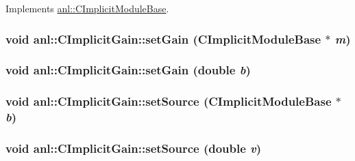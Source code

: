 Implements \hyperlink{classanl_1_1CImplicitModuleBase_ab88f8a1822dcfbc13ba5230318b0acd1}{anl::CImplicitModuleBase}.\hypertarget{classanl_1_1CImplicitGain_a39f85b449cb8e9ace24f8869772cb38f}{
\subsubsection[{setGain}]{\setlength{\rightskip}{0pt plus 5cm}void anl::CImplicitGain::setGain ({\bf CImplicitModuleBase} $\ast$ {\em m})}}
\label{classanl_1_1CImplicitGain_a39f85b449cb8e9ace24f8869772cb38f}
\hypertarget{classanl_1_1CImplicitGain_a045c26e10435c9a89907a2df59d92481}{
\subsubsection[{setGain}]{\setlength{\rightskip}{0pt plus 5cm}void anl::CImplicitGain::setGain (double {\em b})}}
\label{classanl_1_1CImplicitGain_a045c26e10435c9a89907a2df59d92481}
\hypertarget{classanl_1_1CImplicitGain_acbdbe734509bc6c3d69290e4187cf9af}{
\subsubsection[{setSource}]{\setlength{\rightskip}{0pt plus 5cm}void anl::CImplicitGain::setSource ({\bf CImplicitModuleBase} $\ast$ {\em b})}}
\label{classanl_1_1CImplicitGain_acbdbe734509bc6c3d69290e4187cf9af}
\hypertarget{classanl_1_1CImplicitGain_a47dd046c2fe9097bf8017aaf2e31760a}{
\subsubsection[{setSource}]{\setlength{\rightskip}{0pt plus 5cm}void anl::CImplicitGain::setSource (double {\em v})}}
\label{classanl_1_1CImplicitGain_a47dd046c2fe9097bf8017aaf2e31760a}


